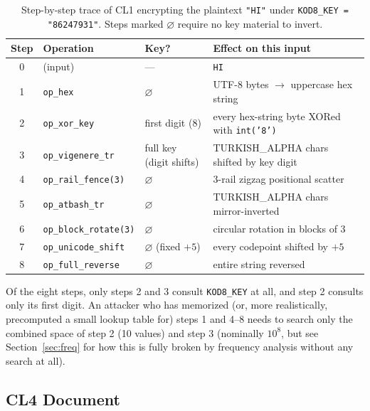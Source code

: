 \documentclass[11pt]{article}
\begin{document}
\begin{table}[h]
\centering
\small
\caption{Step-by-step trace of CL1 encrypting the plaintext \texttt{"HI"} under \texttt{KOD8\_KEY = "86247931"}. Steps marked $\varnothing$ require no key material to invert.}
\label{tab:cl1-trace}
\begin{tabular}{@{}clll@{}}
\toprule
\textbf{Step} & \textbf{Operation} & \textbf{Key?} & \textbf{Effect on this input} \\
\midrule
0 & (input) & --- & \texttt{HI} \\
1 & \texttt{op\_hex} & $\varnothing$ & UTF-8 bytes $\to$ uppercase hex string \\
2 & \texttt{op\_xor\_key} & first digit (8) & every hex-string byte XORed with \texttt{int('8')} \\
3 & \texttt{op\_vigenere\_tr} & full key (digit shifts) & TURKISH\_ALPHA chars shifted by key digit \\
4 & \texttt{op\_rail\_fence(3)} & $\varnothing$ & 3-rail zigzag positional scatter \\
5 & \texttt{op\_atbash\_tr} & $\varnothing$ & TURKISH\_ALPHA chars mirror-inverted \\
6 & \texttt{op\_block\_rotate(3)} & $\varnothing$ & circular rotation in blocks of 3 \\
7 & \texttt{op\_unicode\_shift} & $\varnothing$ (fixed $+5$) & every codepoint shifted by $+5$ \\
8 & \texttt{op\_full\_reverse} & $\varnothing$ & entire string reversed \\
\bottomrule
\end{tabular}
\end{table}

Of the eight steps, only steps 2 and 3 consult \texttt{KOD8\_KEY} at
all, and step 2 consults only its first digit. An attacker who has
memorized (or, more realistically, precomputed a small lookup table
for) steps 1 and 4–8 needs to search only the combined space of step 2
(10 values) and step 3 (nominally $10^{8}$, but see
Section~\ref{sec:freq} for how this is fully broken by frequency
analysis without any search at all).

\subsection{CL4 Document}
\end{document}
